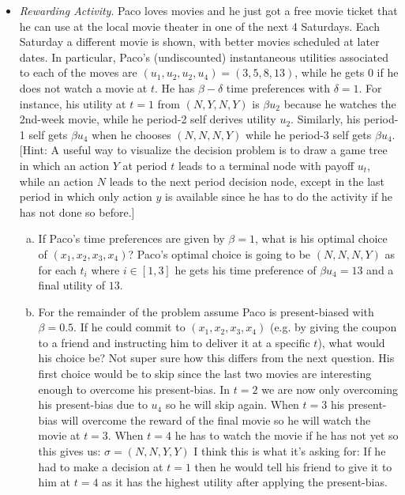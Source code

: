 \documentclass{article}
\begin{document}
\begin{itemize}
\item \emph{Rewarding Activity}. Paco loves movies and he just got a free movie ticket that he can use at the local movie theater in one of the next 4 Saturdays.
Each Saturday a different movie is shown, with better movies scheduled at later dates. In particular, Paco's (undiscounted) instantaneous utilities associated to each of the moves are $(u_1, u_2, u_2, u_4) = (3, 5, 8, 13)$, while he gets 0 if he does not watch a movie at $t$.
He has $\beta - \delta$ time preferences with $\delta=1$.
For instance, his utility at $t = 1$ from $(N,Y,N,Y)$ is $\beta u_2$ because he watches the 2nd-week movie, while he period-2 self derives utility $u_2$.
Similarly, his period-1 self gets $\beta u_4$ when he chooses $(N,N,N,Y)$ while he period-3 self gets $\beta u_4$.
[Hint: A useful way to visualize the decision problem is to draw a game tree in which an action $Y$ at period $t$ leads to a terminal node with payoff $u_t$, while an action $N$ leads to the next period decision node, except in the last period in which only action $y$ is available since he has to do the activity if he has not done so before.]
\begin{enumerate}[(a)]
\item If Paco's time preferences are given by $\beta = 1$, what is his optimal choice of $(x_1,x_2,x_3,x_4)$?
\newline
Paco's optimal choice is going to be $(N, N, N, Y)$ as for each $t_i$ where $i\in[1,3]$ he gets his time preference of $\beta u_4 = 13 $ and a final utility of $13$.

\item For the remainder of the problem assume Paco is present-biased with $\beta = 0.5$.
If he could commit to $(x_1, x_2, x_3, x_4)$ (e.g. by giving the coupon to a friend and instructing him to deliver it at a specific $t$), what would his choice be?
\newline
Not super sure how this differs from the next question.
\newline
His first choice would be to skip since the last two movies are interesting enough to overcome his present-bias.
In $t=2$ we are now only overcoming his present-bias due to $u_4$ so he will skip again.
When $t=3$ his present-bias will overcome the reward of the final movie so he will watch the movie at $t=3$.
When $t=4$ he has to watch the movie if he has not yet so this gives us:
\newline
$\sigma = (N,N,Y,Y) $
\newline
I think this is what it's asking for:
\newline
If he had to make a decision at $t=1$ then he would tell his friend to give it to him at $t=4$ as it has the highest utility after applying the present-bias.


\end{enumerate}
\end{itemize}
\end{document}
